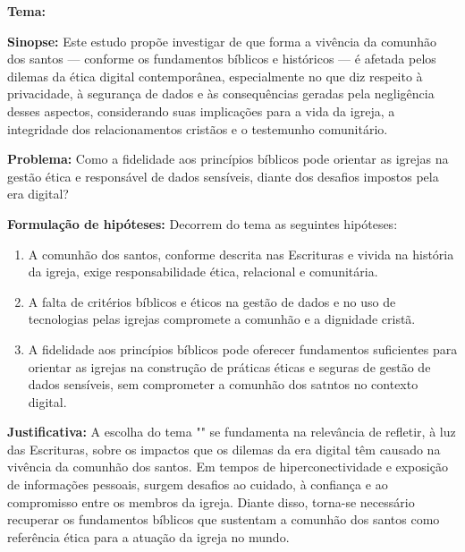 \documentclass[12pt,a4paper]{article}
\begin{document}


\hypersetup{pageanchor=false}  %







\newpage
\pagestyle{plain}
\renewcommand{\baselinestretch}{1.5}
\normalsize
\noindent
\textbf{Tema:} \tema

\noindent
\textbf{Sinopse:} Este estudo propõe investigar de que forma a vivência da comunhão dos santos — conforme os fundamentos bíblicos e históricos — é afetada pelos dilemas da ética digital contemporânea, especialmente no que diz respeito à privacidade, à segurança de dados e às consequências geradas pela negligência desses aspectos, considerando suas implicações para a vida da igreja, a integridade dos relacionamentos cristãos e o testemunho comunitário.

\noindent
\textbf{Problema:} Como a fidelidade aos princípios bíblicos pode orientar as igrejas na gestão ética e responsável de dados sensíveis, diante dos desafios impostos pela era digital?

\noindent
\textbf{Formulação de hipóteses:}
Decorrem do tema as seguintes hipóteses:
\begin{enumerate}
    \item A comunhão dos santos, conforme descrita nas Escrituras e vivida na história da igreja, exige responsabilidade ética, relacional e comunitária.
    \item A falta de critérios bíblicos e éticos na gestão de dados e no uso de tecnologias pelas igrejas compromete a comunhão e a dignidade cristã.
    \item A fidelidade aos princípios bíblicos pode oferecer fundamentos suficientes para orientar as igrejas na construção de práticas éticas e seguras de gestão de dados sensíveis, sem comprometer a comunhão dos satntos no contexto digital.
\end{enumerate}

\noindent
\textbf{Justificativa:} A escolha do tema "\tema" se fundamenta na relevância de refletir, à luz das Escrituras, sobre os impactos que os dilemas da era digital têm causado na vivência da comunhão dos santos. Em tempos de hiperconectividade e exposição de informações pessoais, surgem desafios ao cuidado, à confiança e ao compromisso entre os membros da igreja. Diante disso, torna-se necessário recuperar os fundamentos bíblicos que sustentam a comunhão dos santos como referência ética para a atuação da igreja no mundo.
\end{document}

